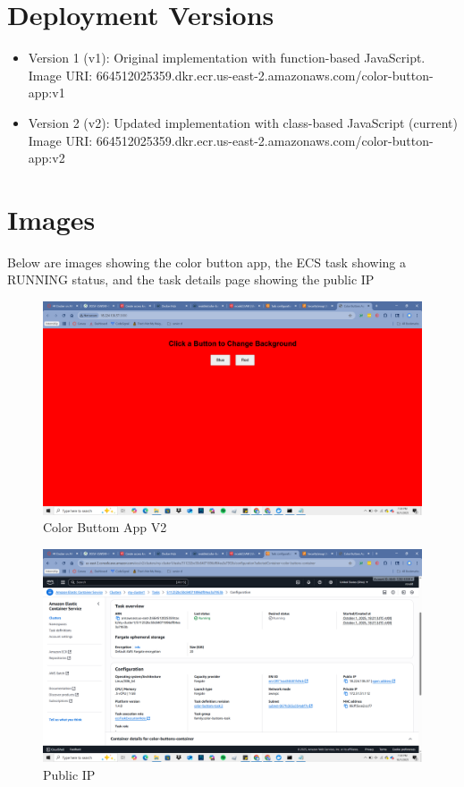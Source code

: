 \section{Deployment Versions}
\begin{itemize}
    \item Version 1 (v1): Original implementation with function-based JavaScript.
    \\ Image URI: 664512025359.dkr.ecr.us-east-2.amazonaws.com/color-button-app:v1
    \item Version 2 (v2): Updated implementation with class-based JavaScript (current)
    \\Image URI: 664512025359.dkr.ecr.us-east-2.amazonaws.com/color-button-app:v2
    
\end{itemize}

\section{Images}

Below are images showing the color button app, the ECS task showing a RUNNING status, and the task details page showing the public IP
\begin{figure}
    \centering
    \includegraphics[width=0.6\linewidth]{Book_SSW590 (1)/eps/Screenshots/NewColorButton.png}
    \caption{Color Buttom App V2}
    \label{fig:Color Buttom App V2}
\end{figure}

\begin{figure}
    \centering
    \includegraphics[width=0.6\linewidth]{Book_SSW590 (1)/eps/Screenshots/PublicIP.png}
    \caption{Public IP}
    \label{fig:Public IP}
\end{figure}

